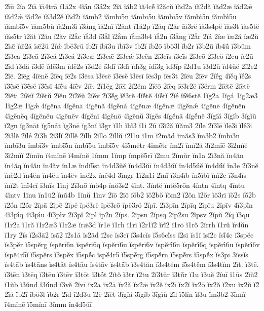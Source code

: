 {2ī́ū
2ĭa
2ĭā
ĭā4trā
ĭ1ā2x
4ĭā́n
ĭ3ā́2x
2ĭă
ĭăb2
ĭă4cĕ́
ĭ2ăcŭ
ĭăd2a
ĭă2dă
ĭăd2æ
ĭăd2ǣ
ĭăd2ǽ
ĭăd2ē
ĭă3d2ĕ
ĭăd2ī
ĭămb2
ĭămbī5n
ĭămbī5u
ĭămbī5v
ĭămbī́5n
ĭămbī́5u
ĭămbī́5v
ĭăm5bŭ
ĭă2m3ĭ
ĭ3ăng
ĭă2nĭ
ĭ2ănt
ĭ1ă2p
ĭ2ăq
ĭ2ăr
ĭă3rĕ
ĭă3s4pĕ
ĭăs3t
ĭăs5tĕ
ĭăs5tr
ĭ2ăt
ĭ2ău
ĭ2ăv
ĭ2ắc
ĭắ3d
ĭ3ắl
ĭ2ắm
ĭắm3b4
ĭắ2n
ĭ3ắng
ĭ2ắr
2ĭá
2ĭæ
ĭæ2ă
ĭæ2ŭ
2ĭǣ
ĭǣ2ă
ĭǣ2ŭ
2ĭǽ
ĭbĕ3rŭ
ĭb2ī
ĭbī3u
ĭbī3v
ĭb2ĭ
ĭb2ō
ĭbŏ3l
ĭb2r
ĭ3b2ū
ĭb4ū́
ĭ3bŭm
2ĭ3ca
2ĭ3cā
2ĭ3că
2ĭ3cá
2ĭ3cæ
2ĭ3cǣ
2ĭ3cǽ
ĭ3cēn
2ĭ3cīs
ĭ3cī́s
2ĭ3cō
2ĭ3cŏ
ĭ2cu
ĭc2ū
2ĭd
ĭ3dă
ĭ3dē
ĭdē3m
ĭdē2s
ĭ3d2ĕ
ĭ3dī
ĭ3dĭ
ĭdĭ3g
ĭdĭ́3g
ĭd3ĭ́p
ĭ2d1u
ĭ3d2ŭ
ĭd4ŭĕ
2ĭ2e2
2ĭē.
2ĭēg
4ĭēnĕ
2ĭēq
ĭē2s
ĭ3ēsa
ĭ3ēsē
ĭ3ēsĕ
ĭ3ēsī
ĭēs3p
ĭēs3t
2ĭēu
2ĭēv
2ĭḗg
4ĭḗq
ĭḗ2s
ĭ3ḗsē
ĭ3ḗsĕ
ĭ3ḗsī
4ĭḗu
4ĭḗv
2ĭĕ.
2ĭ1ĕg
2ĭĕī
2ĭ2ĕm
2ĭĕō
2ĭĕq
ĭĕ3r2ĕ
ĭ3ĕrm
2ĭĕtē
2ĭĕtĕ
2ĭĕtī
2ĭĕtĭ
2ĭĕtŭ
2ĭĕu
2ĭ2ĕŭ
2ĭĕv
2ĭ3ĕ́g
ĭĕ́3rĕ
4ĭĕ́tĕ
4ĭĕ́tĭ
2ĭé
ĭfĕ6stĕ
1ĭg2a
1ĭgá
1ĭg2æ3
1ĭg2ǣ
1ĭgǽ
4ĭgĕna
4ĭgĕnā
4ĭgĕnă
4ĭgĕná
4ĭgĕnæ
4ĭgĕnǣ
4ĭgĕnǽ
4ĭgĕnē
4ĭgĕnĕn
4ĭgĕnĕq
4ĭgĕnĕu
4ĭgĕnĕv
4ĭgĕnī
4ĭgĕnō
4ĭgĕnŭ
3ĭgĕs
4ĭgĕ́nă
4ĭgĕ́nĕ
3ĭgĭă
3ĭgĭb
3ĭgĭŭ
ĭ2gn
ĭg3nāt
ĭg5nā́t
ĭg3nē
ĭg3nĭ
ĭ3gr
ĭ1h
ĭhĭ́3
ĭ1i
2ĭī
ĭ3ĭ2ă
ĭĭăm3
2ĭle
2ĭ3lē
ĭlē3i
ĭlḗ3i
2ĭ3lĕ
2ĭlé
2ĭ3lī
2ĭ3lĭ
2ĭllĕ
2ĭllī
2ĭllō
2ĭllŭ
ĭ2l1u
ĭ1m
ĭ2măd
ĭmăs3
ĭm3b2
ĭmbī3n
ĭmbī3u
ĭmbī3v
ĭmbī́5n
ĭmbī́5u
ĭmbī́5v
4ĭ5mĕtr
4ĭmĕ́tr
ĭm2ĭ
ĭmĭ2ă
3ĭ2mĭē
3ĭ2mĭĕ
3ĭ2mĭĭ
2ĭmĭn
ĭ4mĭnē
ĭ4mĭnĕ
1ĭmm
1ĭmp
ĭmpĕ5rī
ĭ2mu
2ĭmŭr
ĭn1a
2ĭ3nă
ĭn4ăn
ĭn4ăq
ĭn4ău
ĭn4ăv
ĭn1æ
ĭndĭ5st
ĭn4d3ŭĕ
ĭn4d3ŭī
ĭn4d3ŭĭ
ĭn4d5ŭ́ĕ
ĭn4dŭ́ĭ
ĭn3e
2ĭ3nĕ
ĭnĕ2d
ĭn4ĕn
ĭn4ĕu
ĭn4ĕv
ĭnĕ2x
ĭnĕ́4d
3ĭngr
1ĭ2n1i
2ĭnī
ĭ3n4ĭb
ĭn5ĭbĭ
ĭnĭ2c
ĭ3n4ĭs
ĭnĭ2t
ĭnĭ́4cĭ
ĭ3nĭ́s
1ĭnj
2ĭ3nō
ĭnŏ4p
ĭnŏ3s2
4ĭnt.
3ĭntĕ
ĭntĕ5rōn
4ĭntn
4ĭntq
4ĭntu
4ĭntv
1ĭnu
ĭn1ū2
ĭnū́4b
1ĭnŭ
1ĭnv
2ĭō
2ĭŏ
ĭŏb2
ĭŏ2bŏ
ĭŏm2
ĭ2ŏn
ĭ2ŏr
ĭŏ3rī
ĭŏ2s
ĭŏ́2b
ĭ2ŏ́n
ĭ2ŏ́r
2ĭpā
2ĭpē
2ĭpĕ
ĭpĕ3rĕ
ĭpĕ3rō
ĭpĕ3rŏ
2ĭpī.
2ĭ3pīn
2ĭpīq
2ĭpīu
2ĭpīv
4ĭ3pī́n
4ĭ3pī́q
4ĭ3pī́u
4ĭ3pī́v
2ĭ3pĭ
2ĭpl
ĭp2n
2ĭps.
2ĭpsn
2ĭpsq
2ĭp2su
2ĭpsv
2ĭpŭ
2ĭq
ĭ3qu
ĭ1r2a
ĭ1ră
ĭ1r2æ3
ĭ1r2ǣ
ĭrǣ3d
ĭr1ē
ĭ1rh
ĭ1rī
ĭ2r1ĭ2
ĭrĭ́2
ĭ1rō
ĭ1rŏ
2ĭrrh
ĭ1rŭ
ĭr4ŭn
ĭ1ry
2ĭs
ĭ2s3ā2
ĭsā́2
ĭ2s1ă
ĭs2ăd
ĭ2sc
ĭs3cī
ĭ3s4cĭs
ĭ5s6cĭ́ss
ĭ2si
ĭs1ĭ
ĭsĭ2c
ĭsĭ́4c
ĭ3spĕc
ĭs3pĕr
ĭ5spĕrg
ĭspĕrī6n
ĭspĕrī6q
ĭspĕrī6u
ĭspĕrī6v
ĭspĕrī́6n
ĭspĕrī́6q
ĭspĕrī́6u
ĭspĕrī́6v
ĭspĕ4r5ĭ
ĭ5spĕrs
ĭ3spĕx
ĭ5spĕ́c
ĭspĕ́4r5
ĭ5spĕ́rg
ĭ5spĕ́rn
ĭ5spĕ́rs
ĭ5spĕ́x
ĭs3pī
3ĭssĭs
ĭs4tāb
ĭs4tāns
ĭs4tāt
ĭs4tāu
ĭs4tāv
ĭs4tā́b
ĭ3s4tăn
ĭ3s4tĕm
ĭ5s4tĕ́m
ĭ3s4tĭm
2ĭt.
ĭ3tē.
ĭ3tēn
ĭ3tēq
ĭ3tēu
ĭ3tēv
ĭ3tōt
ĭ3tṓt
2ĭtŏ
ĭ3tr
ĭ2tu
2ĭ3tŭr
ĭ3tŭ́r
ĭ1u
ĭ3uĕ
2ĭuī
ĭ1ūs
2ĭŭ2
ĭ1ŭb
ĭ3ŭnd
ĭ3ŭ́nd
ĭ3vĕ
2ĭvī
ĭx2a
ĭx2ā
ĭx2ă
ĭx2ǣ
ĭx2ĕ
ĭx2ī
ĭx2ĭ
ĭx2ō
ĭx2ŏ
ĭ2xu
ĭx2ŭ
ĭ2́
2ĭ́ă
ĭ́b2ī
ĭ́bŏ3l
ĭ́b2r
2ĭ́d
ĭ́2d3u
ĭ́2ĕ
2ĭ́ĕt
3ĭ́gĭă
3ĭ́gĭb
3ĭ́gĭŭ
2ĭ́l
ĭ́5lĭn
ĭ́l3u
ĭ́m3b2
3ĭ́mĭĭ
ĭ́4mĭnē
ĭ́5mĭnī
3ĭ́mm
ĭ́n4d5ŭī
}
